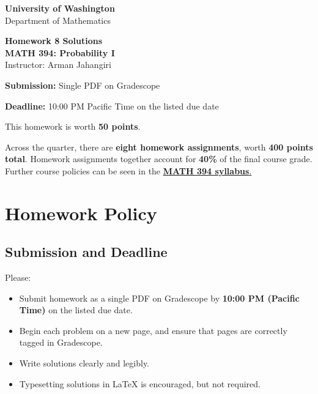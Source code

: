 \documentclass[11pt]{article}
\newcommand{\course}{MATH 394: Probability I}
\newcommand{\department}{Department of Mathematics}
\newcommand{\university}{University of Washington}
\begin{document}
\begin{titlepage}
\centering
\vspace*{1.2cm}

{\Large \textbf{\university}}\\
{\large \department}

\vspace{1.5cm}

{\Huge \color{uwpurple}\textbf{Homework 8 Solutions}}\\[0.25cm]
{\Large \textbf{\course}}\\[0.25cm]
{\large Instructor: Arman Jahangiri}

\vspace{1cm}

\begin{tcolorbox}[width=0.78\textwidth,colback=softpurple,colframe=uwpurple,boxrule=0.9pt,arc=3mm]
\centering
\textbf{Submission:} Single PDF on Gradescope

\textbf{Deadline:} 10:00 PM Pacific Time on the listed due date
\end{tcolorbox}

\vspace{0.8cm}

\begin{tcolorbox}[width=0.86\textwidth,colback=white,colframe=uwgold,boxrule=0.8pt,arc=3mm]
This homework is worth \textbf{50 points}.

Across the quarter, there are \textbf{eight homework assignments}, worth \textbf{400 points total}. Homework assignments together account for \textbf{40\%} of the final course grade. Further course policies can be seen in the \href{https://armanjg.github.io/MATH-394-Probability-1-v2/}{\textbf{MATH 394 syllabus}.}
\end{tcolorbox}

\vfill
\end{titlepage}

\section*{Homework Policy}

\subsection*{Submission and Deadline}

Please:

\begin{itemize}[leftmargin=*]
    \item Submit homework as a single PDF on Gradescope by \textbf{10:00 PM (Pacific Time)} on the listed due date.
    \item Begin each problem on a new page, and ensure that pages are correctly tagged in Gradescope.
    \item Write solutions clearly and legibly.
    \item Typesetting solutions in LaTeX is encouraged, but not required.
\end{itemize}
\end{document}
